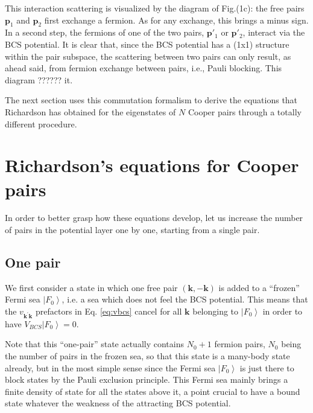 \documentclass[aps,prb,superscriptaddress,showpacs,reprint,lengthcheck]{revtex4-1}
\begin{document}
This interaction scattering is visualized by the diagram of Fig.(1c): the free pairs $\mathbf{p}_1$ and $\mathbf{p}_2$ first
exchange a fermion. As for any exchange, this brings a minus sign. In a
second step, the fermions of one of the two pairs, $\mathbf{p}' _1$ or ${\mathbf{p}}' _2$,  interact via the BCS
potential. It is clear that, since the BCS potential has a (1x1)
structure within the pair subspace, the scattering between two pairs can only result, as ahead said, from
fermion exchange between pairs, i.e., Pauli blocking. This diagram ?????? it.

The next section uses this commutation formalism to derive the equations that Richardson has obtained for the eigenstates of $N$ Cooper pairs through a totally different procedure.

\section{Richardson's equations for Cooper pairs\label{sec:rich}}

In order to better grasp how these equations develop, let us increase the number of pairs in the potential layer one by one, starting from a single pair.

\subsection{One pair}

We first consider a state in which one free pair $(\mathbf{k} ,-\mathbf{k} )$ is added to a
``frozen'' Fermi sea $\left|F_0\right> $, i.e. a sea which does not feel the BCS potential.
This means that the $v_{\mathbf{k} ^{\prime}\mathbf{k} }$ prefactors in Eq.%
\eqref{eq:vbcs} cancel for all $\mathbf{k} $ belonging to $\left|F_0\right> $ in order to have $V_{BCS} \left|F_0\right>=0$.

 Note that this ``one-pair'' state actually contains $N_0+1$ fermion pairs, 
$N_0$ being the number of pairs in the frozen sea, so that this state is a many-body state already, but in the most simple sense since the Fermi sea $%
\left|F_0\right> $ is just there to block states by the Pauli exclusion
principle. This Fermi sea mainly brings a finite density of state for all the
states above it, a point crucial to have a bound state whatever the weakness of the attracting BCS potential.
\end{document}
